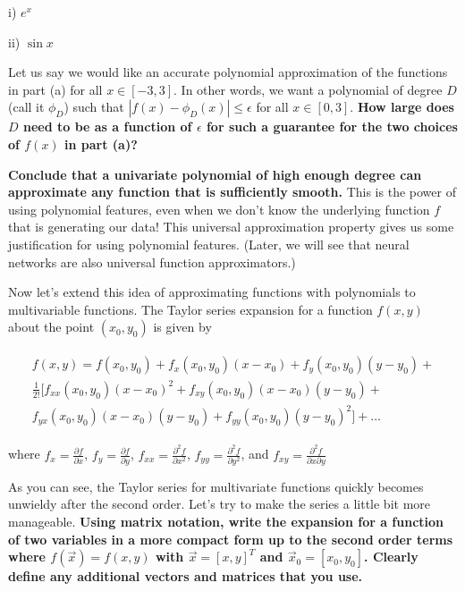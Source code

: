 \begin{Parts}


i) $e^x$

ii) $\sin x$

\Part Let us say we would like an accurate polynomial approximation of the functions in part (a) for all $x \in [-3, 3]$. In other words, we want a polynomial of degree $D$ (call it $\phi_D$) such that $|f(x) - \phi_D(x)| \leq \epsilon$ for all $x \in [0, 3]$. {\bf How large does $D$ need to be as a function of $\epsilon$ for such a guarantee for the two choices of $f(x)$ in part (a)?}


{\bf Conclude that a univariate polynomial of high enough degree can approximate any function that is sufficiently smooth.} This is the power of using polynomial features, even when we don't know the underlying function $f$ that is generating our data! This universal approximation property gives us some justification for using polynomial features. (Later, we will see that neural networks are also universal function approximators.)

\Part Now let's extend this idea of approximating functions with polynomials to multivariable functions.  The Taylor series expansion for a function $f(x,y)$ about the point $(x_0,y_0)$ is given by

\begin{align}
\begin{split}
f(x,y)=f(x_0,y_0)+f_x(x_0,y_0)(x-x_0)+f_y(x_0,y_0)(y-y_0)+ \\
\frac{1}{2!}[f_{xx}(x_0,y_0)(x-x_0)^2+f_{xy}(x_0,y_0)(x-x_0)(y-y_0)+ \\
f_{yx}(x_0,y_0)(x-x_0)(y-y_0)+f_{yy}(x_0,y_0)(y-y_0)^2]+\ldots
\end{split}
\end{align}

where $f_x=\frac{\partial f}{\partial x}$, $f_y=\frac{\partial f}{\partial y}$, $f_{xx}=\frac{\partial^2f}{\partial x^2}$, $f_{yy}=\frac{\partial^2f}{\partial y^2}$, and $f_{xy}=\frac{\partial^2f}{\partial x \partial y}$

As you can see, the Taylor series for multivariate functions quickly becomes unwieldy after the second order.  Let's try to make the series a little bit more manageable.  {\bf Using matrix notation, write the expansion for a function of two variables in a more compact form up to the second order terms where $f(\vec{x})=f(x,y)$ with $\vec{x}=[x,y]^T$ and $\vec{x}_0=[x_0,y_0]$.  Clearly define any additional vectors and matrices that you use.}


\end{Parts}
